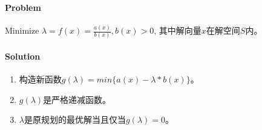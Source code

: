 \paragraph{Problem}
Minimize $\lambda=f(x)=\frac{a(x)}{b(x)}, b(x)>0$, 其中解向量$x$在解空间$S$内。

\paragraph{Solution}
\begin{enumerate}
	\item 构造新函数$g(\lambda)=min\{a(x)-\lambda*b(x)\}$。
	\item $g(\lambda)$是严格递减函数。
	\item $\lambda$是原规划的最优解当且仅当$g(\lambda)=0$。
\end{enumerate}

